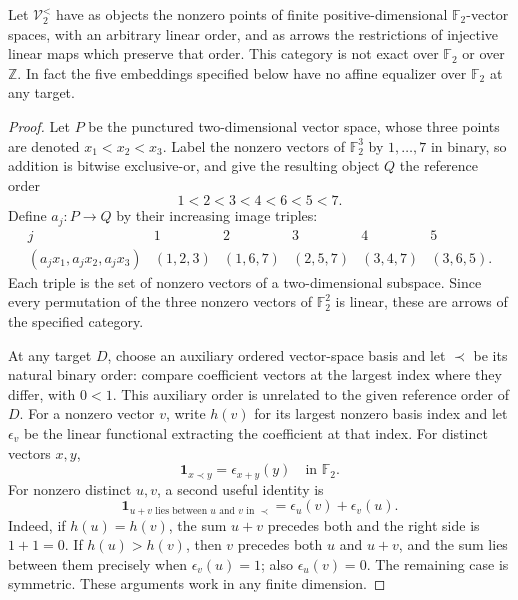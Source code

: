 \begin{proposition}
\label{A:ordered-vector-parity}
Let $\mathcal V^{<}_2$ have as objects the nonzero points of finite
positive-dimensional $\mathbb F_2$-vector spaces, with an arbitrary
linear order, and as arrows the restrictions of injective linear maps
which preserve that order. This category is not exact over
$\mathbb F_2$ or over $\mathbb Z$. In fact the five embeddings
specified below have no affine equalizer over $\mathbb F_2$ at any
target.
\end{proposition}
\begin{proof}
Let $P$ be the punctured two-dimensional vector space, whose three
points are denoted $x_1<x_2<x_3$. Label the nonzero vectors of
$\mathbb F_2^3$ by $1,\ldots,7$ in binary, so addition is bitwise
exclusive-or, and give the resulting object $Q$ the reference order
\[
 1<2<3<4<6<5<7.
\]
Define $a_j:P\to Q$ by their increasing image triples:
\[
\begin{array}{c|ccccc}
 j&1&2&3&4&5\\\hline
 (a_jx_1,a_jx_2,a_jx_3)&(1,2,3)&(1,6,7)&(2,5,7)&(3,4,7)&(3,6,5).
\end{array}
\]
Each triple is the set of nonzero vectors of a two-dimensional
subspace. Since every permutation of the three nonzero vectors of
$\mathbb F_2^2$ is linear, these are arrows of the specified category.

At any target $D$, choose an auxiliary ordered vector-space basis
and let $\prec$ be its natural binary order: compare coefficient
vectors at the largest index where they differ, with $0<1$.
This auxiliary order is unrelated to the given reference order of
$D$. For a nonzero vector $v$, write $h(v)$ for its largest nonzero
basis index and let $\epsilon_v$ be the linear functional extracting
the coefficient at that index. For distinct vectors $x,y$,
\[
 \mathbf1_{x\prec y}=\epsilon_{x+y}(y)\quad\text{in }\mathbb F_2.
\]
For nonzero distinct $u,v$, a second useful identity is
\[
 \mathbf1_{u+v\text{ lies between }u\text{ and }v\text{ in }\prec}
   =\epsilon_u(v)+\epsilon_v(u).
 \tag{*}
\]
Indeed, if $h(u)=h(v)$, the sum $u+v$ precedes both and the right
side is $1+1=0$. If $h(u)>h(v)$, then $v$ precedes both $u$ and
$u+v$, and the sum lies between them precisely when
$\epsilon_v(u)=1$; also $\epsilon_u(v)=0$. The remaining case is
symmetric. These arguments work in any finite dimension.


\end{proof}
